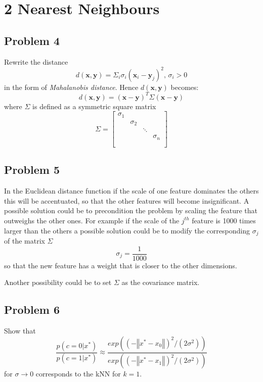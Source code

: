 \section*{2 Nearest Neighbours}

\subsection*{Problem 4}
Rewrite the distance
\[
    d(\mathbf{x}, \mathbf{y}) = 
    \Sigma_i \sigma_i (\mathbf{x}_i - \mathbf{y}_j)^2, \, \sigma_i > 0
\]
in the form of \textit{Mahalanobis distance}. Hence $d(\mathbf{x}, \mathbf{y})$
becomes:
\[
    d(\mathbf{x}, \mathbf{y}) = 
    (\mathbf{x} - \mathbf{y})^T \Sigma (\mathbf{x} - \mathbf{y}) 
\]
where $\Sigma$ is defined as a symmetric square matrix
\[
\Sigma =
\left[
    \begin{array}{ccccc}
        \sigma_1\\
        & \sigma_2\\
        &  & \ddots\\
        &  &  & \sigma_n\\
        \\
    \end{array}
\right]
\]

\subsection*{Problem 5} 
In the Euclidean distance function if the scale of one feature dominates the
others this will be accentuated, so that the other features will become
insignificant.
A possible solution could be to precondition the problem by scaling the feature
that outweighs the other ones. For example if the scale of the $j^{th}$ feature is
1000 times larger than the others a possible solution could be to modify the
corresponding $\sigma_j$ of the matrix $\Sigma$ 
\[
    \sigma_j = \frac{1}{1000}
\]
so that the new feature has a weight that is closer to the other dimensions.

Another possibility could be to set $\Sigma$ as the covariance matrix.


\subsection*{Problem 6} 
Show that 
\[
    \frac{p(c=0 | x^*)}{p(c=1 | x^*)} \approx 
    \frac{exp((-\left\Vert x^* - x_0 \right\Vert)^2/(2\sigma^2))}
         {exp((-\left\Vert x^* - x_1 \right\Vert)^2/(2\sigma^2))}
\]
for $\sigma \rightarrow 0 $ corresponds to the kNN for $k = 1$.

